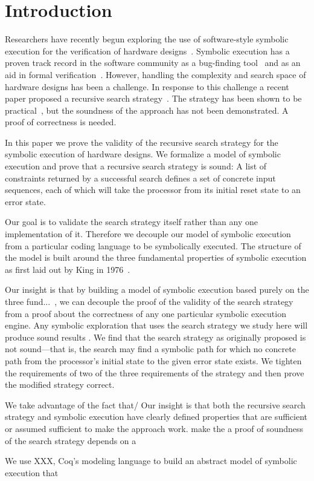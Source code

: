 \section{Introduction}

Researchers have recently begun exploring the use of software-style symbolic execution for the
verification of hardware designs~\cite{mukherjee2015hardware,liu2009star}. Symbolic execution has a proven track record in the software community as a
bug-finding tool~\cite{?} and as an aid in formal verification~\cite{?}. However,
handling the complexity and search space of hardware designs has been a
challenge. In response to this challenge a recent paper proposed a recursive
search strategy~\cite{zhang2018recursive}. The strategy has been shown to be
practical~\cite{zhang2018end}, but the soundness of the approach has not been
demonstrated. A proof of correctness is needed.


In this paper we prove the validity of the recursive search strategy for the
symbolic execution of hardware designs. We formalize a model of symbolic
execution and prove that a recursive search strategy is sound: A list of
constraints returned by a successful search defines a set of concrete input
sequences, each of which will take the processor from its initial reset state to
an error state.

Our goal is to validate the search strategy itself rather than any one implementation
of it. Therefore we decouple our model of symbolic execution from a particular
coding language to be symbolically executed. The structure of the model is built
around the three fundamental properties of symbolic execution as first laid out
by King in 1976~\cite{}.

Our insight is that by building a model of symbolic execution based purely on
the three fund...~\cite{}, we can decouple the proof of the validity of the
search strategy from a proof about the correctness of any one particular
symbolic execution engine. Any symbolic exploration that uses the search
strategy we study here will produce sound results .
We find that the search strategy as originally proposed is not sound---that is, the
search may find a symbolic path for which no concrete path from the processor's initial state
to the given error state exists. We tighten the requirements of two of the three
requirements of the strategy and then prove the modified strategy correct.

We take advantage of the fact that/
Our insight is that both the recursive search strategy and symbolic execution
have clearly defined properties that are sufficient or assumed sufficient to
make the approach work.  make the a proof of soundness of the search strategy depends on a 

We use XXX, Coq's modeling language to build an abstract model of symbolic execution that 


